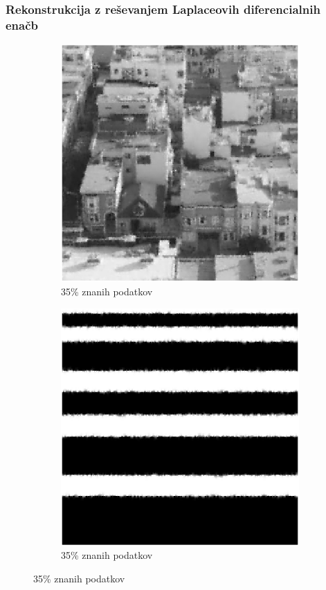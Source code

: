 \documentclass{beamer}
\begin{document}
\begin{frame}
  \frametitle{Rekonstrukcija z reševanjem Laplaceovih diferencialnih enačb}
  \begin{figure}
    \begin{subfigure}{0.49\linewidth}
      \includegraphics[width=\linewidth]{slike/laplac/rez35LapMesto.png}
      \caption{35\% znanih podatkov}
    \end{subfigure}
    \begin{subfigure}{0.49\linewidth}
      \includegraphics[width=\linewidth]{slike/laplac/rez35LapDvobarvna.png}
      \caption{35\% znanih podatkov}
    \end{subfigure}
  \end{figure}
\end{frame}
\end{document}
